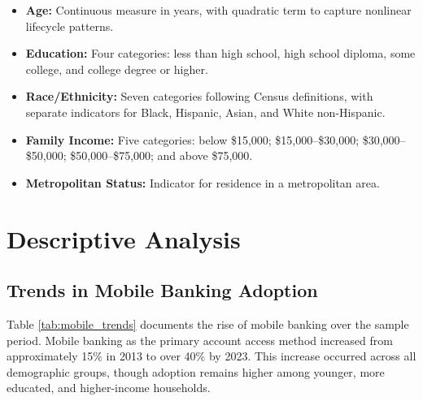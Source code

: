 \documentclass[12pt]{article}
\begin{document}
\begin{itemize}
    \item \textbf{Age:} Continuous measure in years, with quadratic term to capture nonlinear lifecycle patterns.

    \item \textbf{Education:} Four categories: less than high school, high school diploma, some college, and college degree or higher.

    \item \textbf{Race/Ethnicity:} Seven categories following Census definitions, with separate indicators for Black, Hispanic, Asian, and White non-Hispanic.

    \item \textbf{Family Income:} Five categories: below \$15,000; \$15,000--\$30,000; \$30,000--\$50,000; \$50,000--\$75,000; and above \$75,000.

    \item \textbf{Metropolitan Status:} Indicator for residence in a metropolitan area.
\end{itemize}

\section{Descriptive Analysis}

\subsection{Trends in Mobile Banking Adoption}

Table \ref{tab:mobile_trends} documents the rise of mobile banking over the sample period. Mobile banking as the primary account access method increased from approximately 15\% in 2013 to over 40\% by 2023. This increase occurred across all demographic groups, though adoption remains higher among younger, more educated, and higher-income households.
\end{document}
